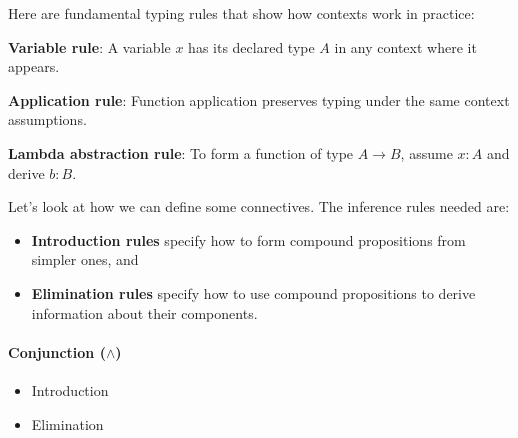 \begin{example}
Here are fundamental typing rules that show how contexts work in practice:

\begin{prooftree}
\end{prooftree}
\textbf{Variable rule}: A variable $x$ has its declared type $A$ in any context where it appears.

\begin{prooftree}
\end{prooftree}
\textbf{Application rule}: Function application preserves typing under the same context assumptions.

\begin{prooftree}
\end{prooftree}
\textbf{Lambda abstraction rule}: To form a function of type $A \to B$, assume $x:A$ and derive $b:B$.
\end{example}


Let's look at how we can define some connectives.
The inference rules needed are:
\begin{itemize}
    \item \textbf{Introduction rules} specify how to form compound propositions from simpler ones, and
    \item \textbf{Elimination rules} specify how to use compound propositions to derive information about their components.
\end{itemize}

\paragraph{Conjunction ($\land$)}
\begin{itemize}
    \item Introduction
    \begin{prooftree}
    \end{prooftree}
    \item Elimination
    \noindent
      \begin{minipage}[t]{0.5\textwidth}
        \begin{prooftree}
        \end{prooftree}
      \end{minipage}\hfill
      \begin{minipage}[t]{0.5\textwidth}
        \begin{prooftree}
        \end{prooftree}
      \end{minipage}
\end{itemize}
